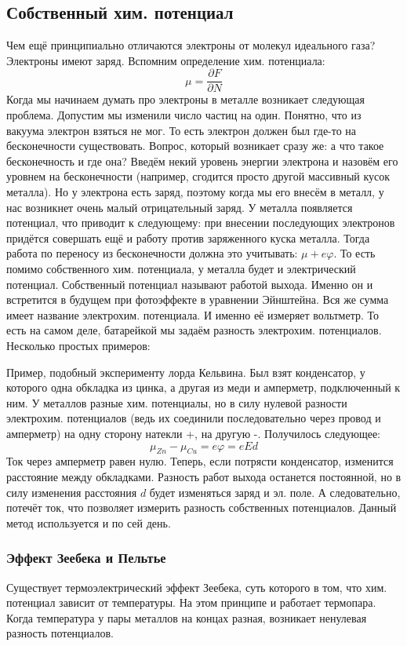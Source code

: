 \documentclass[a4paper, 12pt]{article}
\renewcommand{\phi}{\varphi} %
\begin{document}
	\subsection{Собственный хим. потенциал}
	Чем ещё принципиально отличаются электроны от молекул идеального газа? Электроны имеют заряд. Вспомним определение хим. потенциала:
	\begin{equation*}
		\mu = \frac{\partial F}{\partial N}
	\end{equation*}
	Когда мы начинаем думать про электроны в металле возникает следующая проблема. Допустим мы изменили число частиц на один. Понятно, что из вакуума электрон взяться не мог. То есть электрон должен был где-то на бесконечности существовать. Вопрос, который возникает сразу же: а что такое бесконечность и где она? Введём некий уровень энергии электрона и назовём его уровнем на бесконечности (например, сгодится просто другой массивный кусок металла). Но у электрона есть заряд, поэтому когда мы его внесём в металл, у нас возникнет очень малый отрицательный заряд. У металла появляется потенциал, что приводит к следующему: при внесении последующих электронов придётся совершать ещё и работу против заряженного куска металла. Тогда работа по переносу из бесконечности должна это учитывать: $\mu + e \phi$. То есть помимо собственного хим. потенциала, у металла будет и электрический потенциал. Собственный потенциал называют работой выхода. Именно он и встретится в будущем при фотоэффекте в уравнении Эйнштейна. Вся же сумма имеет название электрохим. потенциала. И именно её измеряет вольтметр. То есть на самом деле, батарейкой мы задаём разность электрохим. потенциалов. Несколько простых примеров:
	
	Пример, подобный эксперименту лорда Кельвина. Был взят конденсатор, у которого одна обкладка из цинка, а другая из меди и амперметр, подключенный к ним. У металлов разные хим. потенциалы, но в силу нулевой разности электрохим. потенциалов (ведь их соединили последовательно через провод и амперметр) на одну сторону натекли +, на другую -. Получилось следующее:
	\begin{equation*}
		\mu_{Zn} - \mu_{Cu} = e \phi = eEd
	\end{equation*}
	Ток через амперметр равен нулю. Теперь, если потрясти конденсатор, изменится расстояние между обкладками. Разность работ выхода останется постоянной, но в силу изменения расстояния $d$ будет изменяться заряд и эл. поле. А следовательно, потечёт ток, что позволяет измерить разность собственных потенциалов. Данный метод используется и по сей день.
	\subsubsection{Эффект Зеебека и Пельтье}	
	Существует термоэлектрический эффект Зеебека, суть которого в том, что хим. потенциал зависит от температуры. На этом принципе и работает термопара. Когда температура у пары металлов на концах разная, возникает ненулевая разность потенциалов.
	
\end{document}
